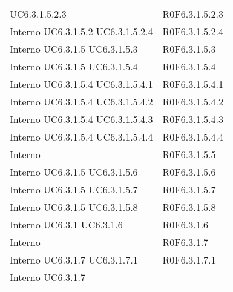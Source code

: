 \begin{longtable}{p{2.5cm}!{\VRule[1pt]}p{2.5cm}}
 \newline UC6.3.1.5.2.3
 & R0F6.3.1.5.2.3 \\
Interno \newline UC6.3.1.5.2
 \newline UC6.3.1.5.2.4
 & R0F6.3.1.5.2.4 \\
Interno \newline UC6.3.1.5
 \newline UC6.3.1.5.3
 & R0F6.3.1.5.3 \\
Interno \newline UC6.3.1.5
 \newline UC6.3.1.5.4
 & R0F6.3.1.5.4 \\
Interno \newline UC6.3.1.5.4
 \newline UC6.3.1.5.4.1
 & R0F6.3.1.5.4.1 \\
Interno \newline UC6.3.1.5.4
 \newline UC6.3.1.5.4.2
 & R0F6.3.1.5.4.2 \\
Interno \newline UC6.3.1.5.4
 \newline UC6.3.1.5.4.3
 & R0F6.3.1.5.4.3 \\
Interno \newline UC6.3.1.5.4
 \newline UC6.3.1.5.4.4
 & R0F6.3.1.5.4.4 \\
Interno & R0F6.3.1.5.5 \\
Interno \newline UC6.3.1.5
 \newline UC6.3.1.5.6
 & R0F6.3.1.5.6 \\
Interno \newline UC6.3.1.5
 \newline UC6.3.1.5.7
 & R0F6.3.1.5.7 \\
Interno \newline UC6.3.1.5
 \newline UC6.3.1.5.8
 & R0F6.3.1.5.8 \\
Interno \newline UC6.3.1
 \newline UC6.3.1.6
 & R0F6.3.1.6 \\
Interno & R0F6.3.1.7 \\
Interno \newline UC6.3.1.7
 \newline UC6.3.1.7.1
 & R0F6.3.1.7.1 \\
Interno \newline UC6.3.1.7

\end{longtable}
